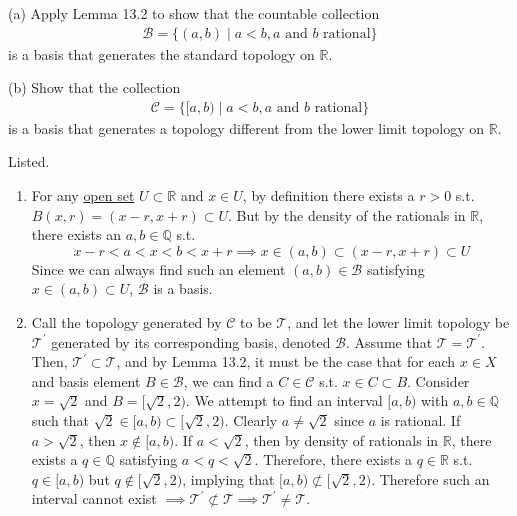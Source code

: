   \begin{exercise}[Munkres 13.8]
    (a) Apply Lemma 13.2 to show that the countable collection
    \begin{align*}
      \mathcal{B} = \{(a, b) \mid a < b, a \text{ and } b \text{ rational}\}
    \end{align*}
    is a basis that generates the standard topology on $\mathbb{R}$.
    
    (b) Show that the collection
    \begin{align*}
      \mathcal{C} = \{[a, b) \mid a < b, a \text{ and } b \text{ rational}\}
    \end{align*}
    is a basis that generates a topology different from the lower limit topology on $\mathbb{R}$.
  \end{exercise}
  \begin{solution}[Munkres 13.8]
    Listed. 
    \begin{enumerate}
      \item For any \hyperref[def:open-set]{open set} $U \subset \mathbb{R}$ and $x \in U$, by definition there exists a $r > 0$ s.t. $B(x, r) = (x - r, x + r) \subset U$. But by the density of the rationals in $\mathbb{R}$, there exists an $a, b \in \mathbb{Q}$ s.t. 
      \begin{equation}
        x - r < a < x < b < x + r \implies x \in (a, b) \subset (x - r, x + r) \subset U
      \end{equation}
      Since we can always find such an element $(a, b) \in \mathcal{B}$ satisfying $x \in (a, b) \subset U$, $\mathcal{B}$ is a basis.  

    \item Call the topology generated by $\mathscr{C}$ to be $\mathscr{T}$, and let the lower limit topology be $\mathscr{T}^\prime$ generated by its corresponding basis, denoted $\mathscr{B}$. Assume that $\mathscr{T} = \mathscr{T}^\prime$. Then, $\mathscr{T}^\prime \subset \mathscr{T}$, and by Lemma 13.2, it must be the case that for each $x \in X$ and basis element $B \in \mathscr{B}$, we can find a $C \in \mathscr{C}$ s.t. $x \in C \subset B$. Consider $x = \sqrt{2}$ and $B = [\sqrt{2}, 2)$. We attempt to find an interval $[a, b)$ with $a, b \in \mathbb{Q}$ such that $\sqrt{2} \in [a, b)\subset[\sqrt{2}, 2)$. Clearly $a \neq \sqrt{2}$ since $a$ is rational. If $a > \sqrt{2}$, then $x \not\in [a, b)$. If $a < \sqrt{2}$, then by density of rationals in $\mathbb{R}$, there exists a $q \in \mathbb{Q}$ satisfying $a < q < \sqrt{2}$. Therefore, there exists a $q \in \mathbb{R}$ s.t. $q \in [a, b)$ but $q \not\in [\sqrt{2}, 2)$, implying that $[a, b) \not\subset [\sqrt{2}, 2)$. Therefore such an interval cannot exist $\implies \mathscr{T}^\prime \not\subset \mathscr{T} \implies \mathscr{T}^\prime \neq \mathscr{T}$.
    \end{enumerate}
  \end{solution}

